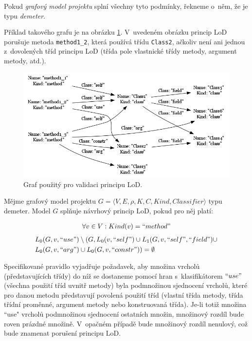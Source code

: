 Pokud \emph{grafový model projektu} splní všechny tyto podmínky, řekneme o~něm, že je typu \emph{demeter}.

Příklad takového grafu je na obrázku \ref{implementation-lod_graph}. V~uvedeném obrázku princip LoD porušuje metoda \verb-method1_2-, která používá třídu \verb-Class2-, ačkoliv není ani jednou z~dovolených tříd principu LoD (třída pole vlastnické třídy metody, argument metody, atd.).

\begin{figure}[h!]
  \centering
  \includegraphics[width=1.0\textwidth]{./graphs/demeter_graph.png}
  \caption{Graf  použitý pro validaci principu LoD.\label{implementation-lod_graph}}
\end{figure}

\begin{designprinciple}
Mějme grafový model projektu $G = \langle V, E, \rho, K, C, \mathit{Kind}, \mathit{Classifier}\rangle$ typu demeter. Model $G$ splňuje návrhový princip LoD, pokud pro něj platí:

\begin{align*}
\forall v \in V: Kind(v) = ``method"\\
\end{align*}
\begin{align*}
&L_0(G, v, ``use") \setminus (G, L_0(v, ``self") \cup L_1(G, v, ``self", ``field") \cup \\
&L_0(G, v, ``arg") \cup L_0(G, v, ``constr")) = \emptyset
\end{align*}

\end{designprinciple}

Specifikované pravidlo vyjadřuje požadavek, aby množina vrcholů (představujících třídy) do níž se dostaneme pomocí hran s~klasifikátorem $``use"$ (všechna použití tříd uvnitř metody) byla podmnožinou sjednocení vrcholů, které pro danou metodu představují povolená použití tříd (vlastní třída metody, třída třídní proměnné, argument metody nebo konstruovaná třída). Je-li totiž množina ``use" vrcholů podmnožinou sjednocení ostatních množin, množinový rozdíl bude roven prázdné množině. V~opačném případě bude množinový rozdíl nenulový, což bude znamenat porušení principu LoD.

